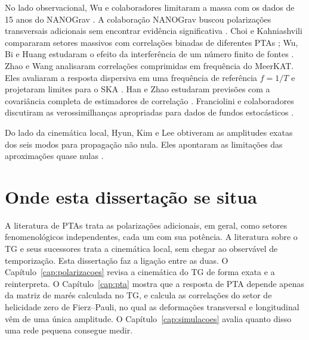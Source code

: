 No lado observacional, Wu e colaboradores limitaram a massa com os dados
de 15 anos do NANOGrav \autocite{wu2024}. A colaboração NANOGrav buscou
polarizações transversais adicionais sem encontrar evidência
significativa \autocite{nanograv2024}. Choi e Kahniashvili compararam
setores massivos com correlações binadas de diferentes PTAs
\autocite{choi2025}; Wu, Bi e Huang estudaram o efeito da interferência
de um número finito de fontes \autocite{wu2025}. Zhao e Wang analisaram
correlações comprimidas em frequência do MeerKAT. Eles avaliaram a
resposta dispersiva em uma frequência de referência $f=1/T$ e
projetaram limites para o SKA \autocite{zhao2026}. Han e Zhao
estudaram previsões com a covariância completa de estimadores de
correlação \autocite{han2026}. Franciolini e colaboradores discutiram as
verossimilhanças apropriadas para dados de fundos estocásticos
\autocite{franciolini2025}.

Do lado da cinemática local, Hyun, Kim e Lee obtiveram as amplitudes
exatas dos seis modos para propagação não nula. Eles apontaram as
limitações das aproximações quase nulas \autocite{hyun2019}.

\section{Onde esta dissertação se situa}

A literatura de PTAs trata as polarizações adicionais, em geral, como
setores fenomenológicos independentes, cada um com sua potência. A
literatura sobre o TG e seus sucessores trata a cinemática local, sem
chegar ao observável de temporização. Esta dissertação faz a ligação
entre as duas. O Capítulo~\ref{cap:polarizacoes} revisa a cinemática do
TG de forma exata e a reinterpreta. O Capítulo~\ref{cap:pta} mostra que
a resposta de PTA depende apenas da matriz de marés calculada no TG, e
calcula as correlações do setor de helicidade zero de Fierz--Pauli, no
qual as deformações transversal e longitudinal vêm de uma única
amplitude. O Capítulo~\ref{cap:simulacoes} avalia quanto disso uma rede
pequena consegue medir.
